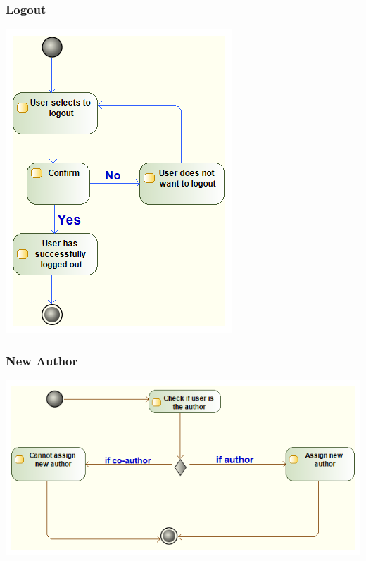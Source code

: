 \documentclass[11pt]{article}
\begin{document}
\newpage
\subsubsection{Logout}
\begin{center} 
	\includegraphics[width=\textwidth]{../Images/Logout_Activity_Diagram.png}\\[0.5cm]
\end{center}

\newpage
\subsubsection{New Author}
\begin{center} 
	\includegraphics[width=\textwidth]{../Images/newAuthor_Activity_Diagram.png}\\[0.5cm]
\end{center}
\end{document}
